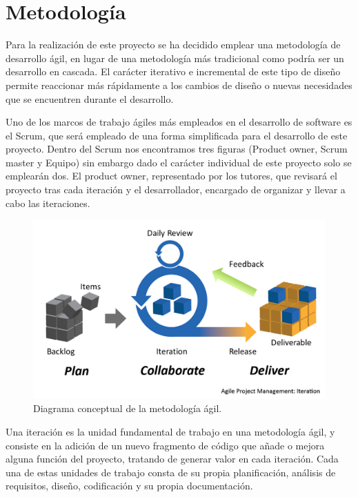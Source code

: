 \section{Metodología}

    Para la realización de este proyecto se ha decidido emplear una metodología de desarrollo ágil, en lugar de una metodología más tradicional como podría ser un desarrollo en cascada. El carácter iterativo e incremental de este tipo de diseño permite reaccionar más rápidamente a los cambios de diseño o nuevas necesidades que se encuentren durante el desarrollo.

    Uno de los marcos de trabajo ágiles más empleados en el desarrollo de software es el Scrum, que será empleado de una forma simplificada para el desarrollo de este proyecto. Dentro del Scrum nos encontramos tres figuras (Product owner, Scrum master y Equipo) sin embargo dado el carácter individual de este proyecto solo se emplearán dos. El product owner, representado por los tutores, que revisará el proyecto tras cada iteración y el desarrollador, encargado de organizar y llevar a cabo las iteraciones.

    \begin{figure}[H]  
        \centering
            \includegraphics[width =0.9\linewidth]{figuras/Agile.png}
        \caption{Diagrama conceptual de la metodología ágil.}
        \label{fig:agile}
    \end{figure}

    Una iteración es la unidad fundamental de trabajo en una metodología ágil, y consiste en la adición de un nuevo fragmento de código que añade o mejora alguna función del proyecto, tratando de generar valor en cada iteración. Cada una de estas unidades de trabajo consta de su propia planificación, análisis de requisitos, diseño, codificación y su propia documentación.

